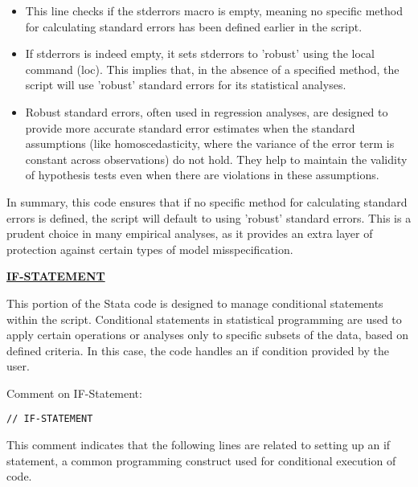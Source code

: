 \documentclass{article}
\begin{document}
\begin{itemize}
    \item This line checks if the stderrors macro is empty, meaning no specific method for calculating standard errors has been defined earlier in the script.
    \item If stderrors is indeed empty, it sets stderrors to 'robust' using the local command (loc). This implies that, in the absence of a specified method, the script will use 'robust' standard errors for its statistical analyses.
    \item Robust standard errors, often used in regression analyses, are designed to provide more accurate standard error estimates when the standard assumptions (like homoscedasticity, where the variance of the error term is constant across observations) do not hold. They help to maintain the validity of hypothesis tests even when there are violations in these assumptions.
\end{itemize}


In summary, this code ensures that if no specific method for calculating standard errors is defined, the script will default to using 'robust' standard errors. This is a prudent choice in many empirical analyses, as it provides an extra layer of protection against certain types of model misspecification.



\underline{\textbf{IF-STATEMENT}}

\vspace{0.3cm} This portion of the Stata code is designed to manage conditional statements within the script. Conditional statements in statistical programming are used to apply certain operations or analyses only to specific subsets of the data, based on defined criteria. In this case, the code handles an if condition provided by the user. \newline

Comment on IF-Statement:

\begin{mdframed}
\begin{verbatim}
// IF-STATEMENT
\end{verbatim}
\end{mdframed}


\vspace{0.3cm} This comment indicates that the following lines are related to setting up an if statement, a common programming construct used for conditional execution of code. \newline
\end{document}

